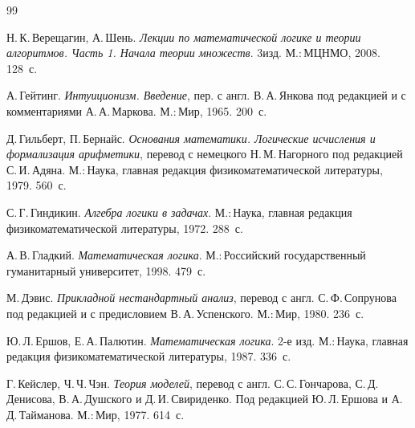 \begin{thebibliography}{99}

Н.\,К.\,Верещагин, А.\,Шень. \textit{Лекции по математичес\-кой логике и
теории алгоритмов. Часть 1. Начала теории множеств}. 3\д изд.
М.:\,МЦНМО, 2008. 128~с.


А.\,Гейтинг. \textit{Интуиционизм. Введение}, пер. с
англ. В.\,А.\,Янкова под редакцией и с комментариями
А.\,А.\,Маркова. М.:\,Мир, 1965. 200~с.



Д.\,Гильберт, П.\,Бернайс. \textit{Основания математики.
Логические исчисления и формализация арифметики}, перевод с
немецкого Н.\,М.\,Нагорного под редакцией С.\,И.\,Адяна.
М.:\,Наука, главная редакция физико\д математической литературы,
1979. 560~с.


С.\,Г.\,Гиндикин. \textit{Алгебра логики в задачах}. М.:\,Наука,
главная редакция физико\д математической литературы, 1972.
288~с.


А.\,В.\,Гладкий. \textit{Математическая логика}. М.:\,Рос\-сий\-с\-кий
государственный гуманитарный университет, 1998. 479~с.


М.\,Дэвис. \textit{Прикладной нестандартный анализ}, перевод с
англ. С.\,Ф.\,Сопрунова под редакцией и с предисловием
В.\,А.\,Ус\-пен\-с\-ко\-го. М.:\,Мир, 1980. 236~с.

%


Ю.\,Л.\,Ершов, Е.\,А.\,Палютин. \textit{Математическая логика}. 2-е изд.
М.:\,Нау\-ка, главная редакция физико\д математической литературы,
1987. 336~с. 


Г.\,Кейслер, Ч.\,Ч.\,Чэн. \textit{Теория моделей},
перевод с англ. С.\,С.\,Гон\-ча\-ро\-ва, С.\,Д.\,Денисова,
В.\,А.\,Душского и Д.\,И.\,Свириденко. Под редакцией
Ю.\,Л.\,Ершова и А.\,Д.\,Тайманова. М.:\,Мир, 1977. 614~с.


\end{thebibliography}
